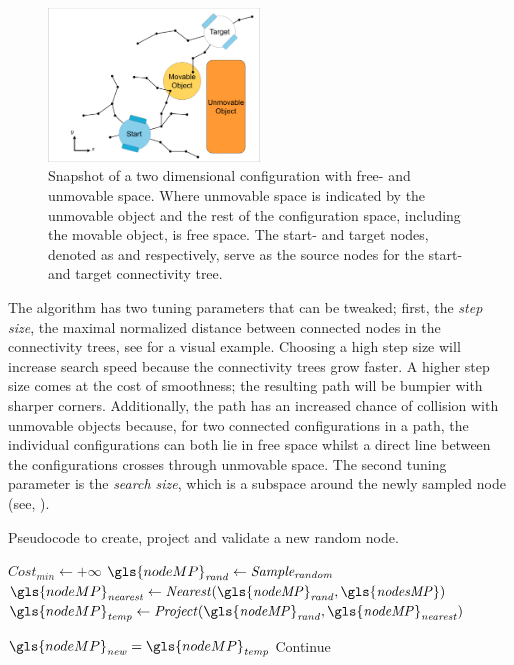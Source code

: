 \begin{figure}[H]
    \centering
    \includegraphics[width=0.5\textwidth, cfbox=my_grey 5pt 0pt]{figures/required_background/mp/1mp_init.drawio.png}
    \caption{Snapshot of a two dimensional configuration with free- and unmovable space. Where unmovable space is indicated by the unmovable object and the rest of the configuration space, including the movable object, is free space. The start- and target nodes, denoted as  and  respectively, serve as the source nodes for the start- and target connectivity tree.}
    \label{fig:motion_planner_adding_one_node_all}
\end{figure}

The algorithm has two tuning parameters that can be tweaked; first, the \textit{step size}, the maximal normalized distance between connected nodes in the connectivity trees, see  for a visual example. Choosing a high step size will increase search speed because the connectivity trees grow faster. A higher step size comes at the cost of smoothness; the resulting path will be bumpier with sharper corners. Additionally, the path has an increased chance of collision with unmovable objects because, for two connected configurations in a path, the individual configurations can both lie in free space whilst a direct line between the configurations crosses through unmovable space. The second tuning parameter is the \textit{search size}, which is a subspace around the newly sampled node (see, ).\bs

\begin{algorithm}[H]
\caption{Pseudocode to create, project and validate a new random node.}%
\label{pseudocode:proposed_rrt_star_one}
\begin{algorithmic}[1]
  \hspace{-0.9cm}\colorbox{my_light_blue}{\parbox{\linewidth}{%
    \State $Cost_\mathit{min} \leftarrow +\infty$
    \State $\gls{nodeMP}_\mathit{rand} \leftarrow \mathit{Sample_{random}}$
    \State $\gls{nodeMP}_\mathit{nearest} \leftarrow \mathit{Nearest(\gls{nodeMP}_{rand}, \gls{nodesMP})}$
    \State $\gls{nodeMP}_\mathit{temp} \leftarrow \mathit{Project(\gls{nodeMP}_{rand}, \gls{nodeMP}_{nearest})}$

    \State $\gls{nodeMP}_\mathit{new} = \gls{nodeMP}_\mathit{temp}$
    \Else
        \State Continue
    \EndIf
}}
\end{algorithmic}
\end{algorithm}

